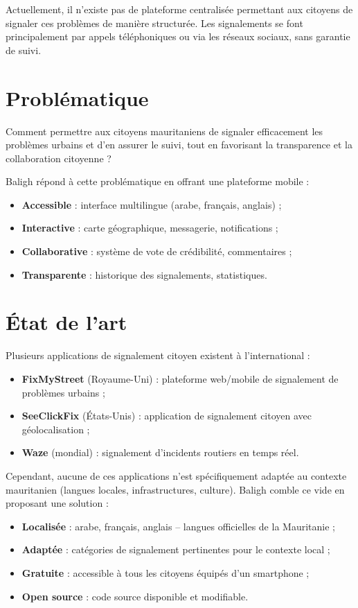 \documentclass[12pt,a4paper]{report}
\begin{document}
Actuellement, il n'existe pas de plateforme centralisée permettant aux citoyens de signaler ces problèmes de manière structurée. Les signalements se font principalement par appels téléphoniques ou via les réseaux sociaux, sans garantie de suivi.

\section{Problématique}

Comment permettre aux citoyens mauritaniens de signaler efficacement les problèmes urbains et d'en assurer le suivi, tout en favorisant la transparence et la collaboration citoyenne ?

Baligh répond à cette problématique en offrant une plateforme mobile :
\begin{itemize}
    \item \textbf{Accessible} : interface multilingue (arabe, français, anglais) ;
    \item \textbf{Interactive} : carte géographique, messagerie, notifications ;
    \item \textbf{Collaborative} : système de vote de crédibilité, commentaires ;
    \item \textbf{Transparente} : historique des signalements, statistiques.
\end{itemize}

\section{État de l'art}

Plusieurs applications de signalement citoyen existent à l'international :
\begin{itemize}
    \item \textbf{FixMyStreet} (Royaume-Uni) : plateforme web/mobile de signalement de problèmes urbains ;
    \item \textbf{SeeClickFix} (États-Unis) : application de signalement citoyen avec géolocalisation ;
    \item \textbf{Waze} (mondial) : signalement d'incidents routiers en temps réel.
\end{itemize}

Cependant, aucune de ces applications n'est spécifiquement adaptée au contexte mauritanien (langues locales, infrastructures, culture). Baligh comble ce vide en proposant une solution :
\begin{itemize}
    \item \textbf{Localisée} : arabe, français, anglais -- langues officielles de la Mauritanie ;
    \item \textbf{Adaptée} : catégories de signalement pertinentes pour le contexte local ;
    \item \textbf{Gratuite} : accessible à tous les citoyens équipés d'un smartphone ;
    \item \textbf{Open source} : code source disponible et modifiable.
\end{itemize}
\end{document}
